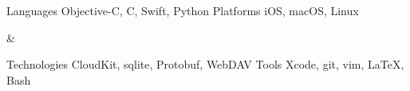 

\begin{cvskills}
\begin{cvskillgroup}
\cvskill
	{Languages}
	{Objective-C, C, Swift, Python}
\cvskill
	{Platforms}
	{iOS, macOS, Linux}
\end{cvskillgroup} &
\begin{cvskillgroup}
\cvskill
	{Technologies}
	{CloudKit, sqlite, Protobuf, WebDAV}
\cvskill
	{Tools}
	{Xcode, git, vim, \LaTeX{}, Bash}
\end{cvskillgroup}
\end{cvskills}
